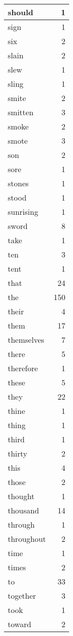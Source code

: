 \begin{center}
\begin{longtable}{l|r}
should & 1 \\ \hline
sign & 1 \\ \hline
six & 2 \\ \hline
slain & 2 \\ \hline
slew & 1 \\ \hline
sling & 1 \\ \hline
smite & 2 \\ \hline
smitten & 3 \\ \hline
smoke & 2 \\ \hline
smote & 3 \\ \hline
son & 2 \\ \hline
sore & 1 \\ \hline
stones & 1 \\ \hline
stood & 1 \\ \hline
sunrising & 1 \\ \hline
sword & 8 \\ \hline
take & 1 \\ \hline
ten & 3 \\ \hline
tent & 1 \\ \hline
that & 24 \\ \hline
the & 150 \\ \hline
their & 4 \\ \hline
them & 17 \\ \hline
themselves & 7 \\ \hline
there & 5 \\ \hline
therefore & 1 \\ \hline
these & 5 \\ \hline
they & 22 \\ \hline
thine & 1 \\ \hline
thing & 1 \\ \hline
third & 1 \\ \hline
thirty & 2 \\ \hline
this & 4 \\ \hline
those & 2 \\ \hline
thought & 1 \\ \hline
thousand & 14 \\ \hline
through & 1 \\ \hline
throughout & 2 \\ \hline
time & 1 \\ \hline
times & 2 \\ \hline
to & 33 \\ \hline
together & 3 \\ \hline
took & 1 \\ \hline
toward & 2 \\ \hline

\end{longtable}
\end{center}
